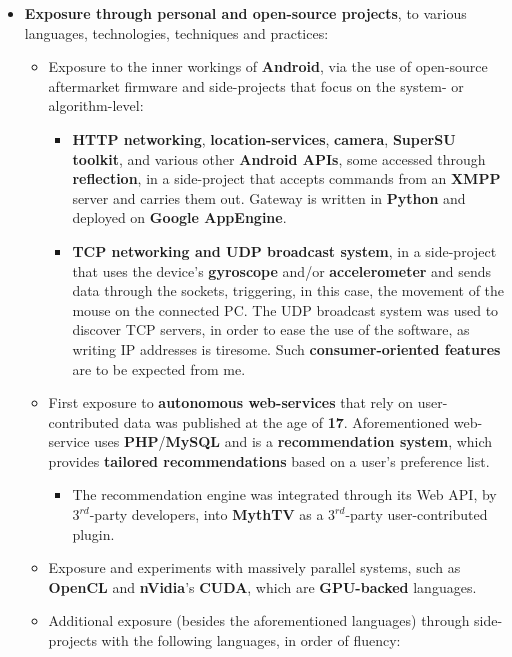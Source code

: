 \documentclass[11pt,a4paper]{article}
\begin{document}
\begin{itemize}
\begin{itemize}
		\end{itemize}
	\item	\textbf{Exposure through personal and open-source projects}, to various languages, technologies, techniques and practices:
		\begin{itemize}
		\item	Exposure to the inner workings of \textbf{Android}, via the use of open-source aftermarket firmware and side-projects that focus on the system- or algorithm-level:
			\begin{itemize}
			\item	\textbf{HTTP networking}, \textbf{location-services}, \textbf{camera}, \textbf{SuperSU toolkit}, and various other \textbf{Android APIs}, some accessed through \textbf{reflection}, in a side-project that accepts commands from an \textbf{XMPP} server and carries them out. Gateway is written in \textbf{Python} and deployed on \textbf{Google AppEngine}.
			\item	\textbf{TCP networking and UDP broadcast system}, in a side-project that uses the device's \textbf{gyroscope} and/or \textbf{accelerometer} and sends data through the sockets, triggering, in this case, the movement of the mouse on the connected PC. The UDP broadcast system was used to discover TCP servers, in order to ease the use of the software, as writing IP addresses is tiresome. Such \textbf{consumer-oriented features} are to be expected from me.
			\end{itemize}
		\item	First exposure to \textbf{autonomous web-services} that rely on user-contributed data was published at the age of \textbf{17}. Aforementioned web-service uses \textbf{PHP}/\textbf{MySQL} and is a \textbf{recommendation system}, which provides \textbf{tailored recommendations} based on a user's preference list.
			\begin{itemize}
			\item	The recommendation engine was integrated through its Web API, by $3^{rd}$-party developers, into \textbf{MythTV} as a $3^{rd}$-party user-contributed plugin.
			\end{itemize}
		\item	Exposure and experiments with massively parallel systems, such as \textbf{OpenCL} and \textbf{nVidia}'s \textbf{CUDA}, which are \textbf{GPU-backed} languages.
		\item	Additional exposure (besides the aforementioned languages) through side-projects with the following languages, in order of fluency:
			\begin{itemize}

\end{itemize}
\end{itemize}
\end{itemize}
\end{document}
